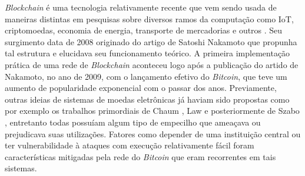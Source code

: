 \textit{Blockchain} é uma tecnologia relativamente recente que vem sendo usada de maneiras distintas em pesquisas sobre diversos ramos da computação como \ac{IoT}, criptomoedas, economia de energia, transporte de mercadorias e outros \cite{blockchain:iot, blockchain:survey, blockchain:energia_dc}. Seu surgimento data de 2008 originado do artigo de Satoshi Nakamoto  \cite{blockchain:bitcoin_whitepaper} que propunha tal estrutura e elucidava seu funcionamento teórico. A primeira implementação prática de uma rede de \textit{Blockchain} aconteceu logo após a publicação do artido de Nakamoto, no ano de 2009, com o lançamento efetivo do \textit{Bitcoin}, que teve um aumento de popularidade exponencial com o passar dos anos. Previamente, outras ideias de sistemas de moedas eletrônicas já haviam sido propostas como por exemplo os trabalhos primordiais de Chaum  \cite{blockchain:chaum83}, Law \cite{blockchain:law1996make} e posteriormente de Szabo \cite{blockchain:szabo1998}, entretanto todas possuíam algum tipo de empecilho que ameaçava ou prejudicava suas utilizações. Fatores como depender de uma instituição central ou ter vulnerabilidade à ataques com execução relativamente fácil \cite{blockchain:survey_bitcoin} foram características mitigadas pela rede do \textit{Bitcoin} que eram recorrentes em tais sistemas.

